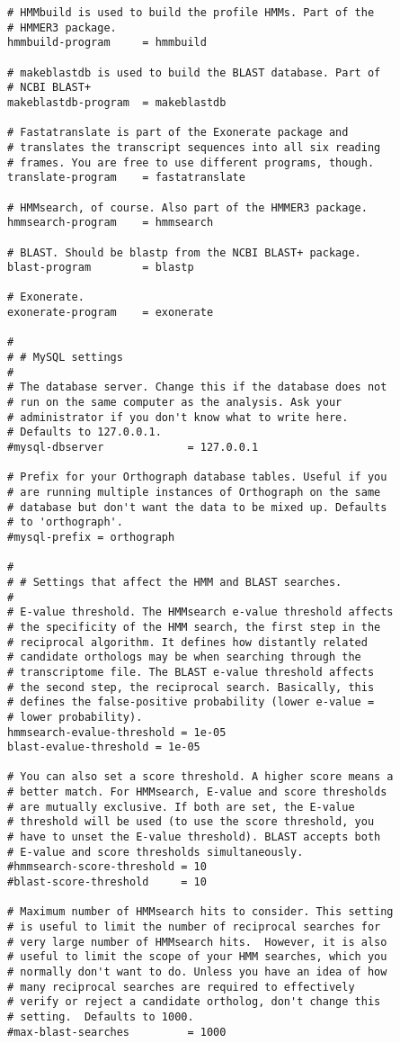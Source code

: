 \begin{verbatim}
# HMMbuild is used to build the profile HMMs. Part of the
# HMMER3 package.
hmmbuild-program     = hmmbuild

# makeblastdb is used to build the BLAST database. Part of
# NCBI BLAST+
makeblastdb-program  = makeblastdb

# Fastatranslate is part of the Exonerate package and
# translates the transcript sequences into all six reading
# frames. You are free to use different programs, though.
translate-program    = fastatranslate

# HMMsearch, of course. Also part of the HMMER3 package.
hmmsearch-program    = hmmsearch

# BLAST. Should be blastp from the NCBI BLAST+ package.
blast-program        = blastp

# Exonerate. 
exonerate-program    = exonerate

#
# # MySQL settings
#
# The database server. Change this if the database does not
# run on the same computer as the analysis. Ask your
# administrator if you don't know what to write here.
# Defaults to 127.0.0.1.
#mysql-dbserver             = 127.0.0.1

# Prefix for your Orthograph database tables. Useful if you
# are running multiple instances of Orthograph on the same
# database but don't want the data to be mixed up. Defaults
# to 'orthograph'.
#mysql-prefix = orthograph

#
# # Settings that affect the HMM and BLAST searches.
#
# E-value threshold. The HMMsearch e-value threshold affects
# the specificity of the HMM search, the first step in the
# reciprocal algorithm. It defines how distantly related
# candidate orthologs may be when searching through the
# transcriptome file. The BLAST e-value threshold affects
# the second step, the reciprocal search. Basically, this
# defines the false-positive probability (lower e-value =
# lower probability).
hmmsearch-evalue-threshold = 1e-05
blast-evalue-threshold = 1e-05

# You can also set a score threshold. A higher score means a
# better match. For HMMsearch, E-value and score thresholds
# are mutually exclusive. If both are set, the E-value
# threshold will be used (to use the score threshold, you
# have to unset the E-value threshold). BLAST accepts both
# E-value and score thresholds simultaneously.
#hmmsearch-score-threshold = 10
#blast-score-threshold     = 10

# Maximum number of HMMsearch hits to consider. This setting
# is useful to limit the number of reciprocal searches for
# very large number of HMMsearch hits.  However, it is also
# useful to limit the scope of your HMM searches, which you
# normally don't want to do. Unless you have an idea of how
# many reciprocal searches are required to effectively
# verify or reject a candidate ortholog, don't change this
# setting.  Defaults to 1000.
#max-blast-searches         = 1000


\end{verbatim}
